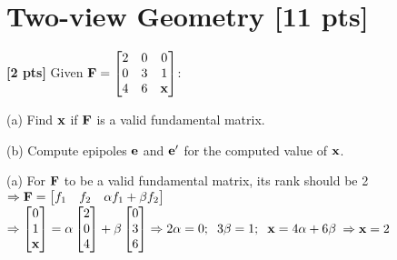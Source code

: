 \documentclass[11pt,addpoints,answers]{exam}
\numberwithin{equation}{section} %
\numberwithin{figure}{section} %
\numberwithin{table}{section} %
\begin{document}
\clearpage

\section{Two-view Geometry  [11 pts]}
\begin{questions}

\question \textbf{[2 pts]} Given $\mathbf{F} = \begin{bmatrix}
2 & 0 & 0 \\ 
0 & 3 & 1 \\ 
4 & 6 & \mathbf{x}
\end{bmatrix}$:

(a) Find $\mathbf{x}$ if $\mathbf{F}$ is a valid fundamental matrix.

(b) Compute epipoles $\mathbf{e}$ and $\mathbf{e}'$ for the computed value of $\mathbf{x}$.

\begin{tcolorbox}[fit,height=5cm, width=\textwidth, blank, borderline={0.5pt}{-2pt},halign=left, valign=center, nobeforeafter]

(a) For $\mathbf{F}$ to be a valid fundamental matrix, its rank should be 2 $\Rightarrow \mathbf{F} = \begin{bmatrix} f_1 & f_2 & \alpha f_1 + \beta f_2 \end{bmatrix}$\\
$\Rightarrow \begin{bmatrix}0\\1\\ \mathbf{x} \end{bmatrix} = \alpha \begin{bmatrix}2\\0\\4 \end{bmatrix} + \beta \begin{bmatrix}0\\3\\6 \end{bmatrix} \Rightarrow 2\alpha =0;\hspace{0.2cm}3\beta =1 ; \hspace{0.2cm} \mathbf{x} = 4\alpha + 6\beta$ \textcolor{red}{$\Rightarrow \mathbf{x} = 2$}\\


\end{tcolorbox}
\end{questions}
\end{document}
